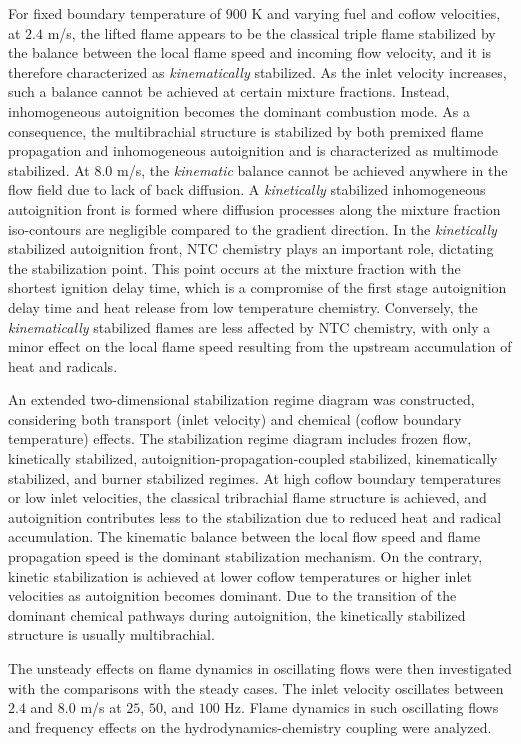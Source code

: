 For fixed boundary temperature of $900$ K and varying fuel and coflow velocities, at $2.4$ m/s, the lifted flame appears to be the classical triple flame stabilized by the balance between the local flame speed and incoming flow velocity, and it is therefore characterized as \emph {kinematically} stabilized.  As the inlet velocity increases, such a balance cannot be achieved at certain mixture fractions.  Instead, inhomogeneous autoignition becomes the dominant combustion mode.  As a consequence, the multibrachial structure is stabilized by both premixed flame propagation and inhomogeneous autoignition and is characterized as multimode stabilized.  At $8.0$ m/s, the \emph{kinematic} balance cannot be achieved anywhere in the flow field due to lack of back diffusion.  A \emph{kinetically} stabilized inhomogeneous autoignition front is formed where diffusion processes along the mixture fraction iso-contours are negligible compared to the gradient direction.  In the \emph{kinetically} stabilized autoignition front, NTC chemistry plays an important role, dictating the stabilization point.  This point occurs at the mixture fraction with the shortest ignition delay time, which is a compromise of the first stage autoignition delay time and heat release from low temperature chemistry.  Conversely, the \emph{kinematically} stabilized flames are less affected by NTC chemistry, with only a minor effect on the local flame speed resulting from the upstream accumulation of heat and radicals.  

An extended two-dimensional stabilization regime diagram was constructed, considering both transport (inlet velocity) and chemical (coflow boundary temperature) effects.  The stabilization regime diagram includes frozen flow, kinetically stabilized, autoignition-propagation-coupled stabilized, kinematically stabilized, and burner stabilized regimes.  At high coflow boundary temperatures or low inlet velocities, the classical tribrachial flame structure is achieved, and autoignition contributes less to the stabilization due to reduced heat and radical accumulation.  The kinematic balance between the local flow speed and flame propagation speed is the dominant stabilization mechanism.  On the contrary, kinetic stabilization is achieved at lower coflow temperatures or higher inlet velocities as autoignition becomes dominant.  Due to the transition of the dominant chemical pathways during autoignition, the kinetically stabilized structure is usually multibrachial.

The unsteady effects on flame dynamics in oscillating flows were then investigated with the comparisons with the steady cases.  The inlet velocity oscillates between $2.4$ and $8.0$ m/s at $25$, $50$, and $100$ Hz.  Flame dynamics in such oscillating flows and frequency effects on the hydrodynamics-chemistry coupling were analyzed.  


